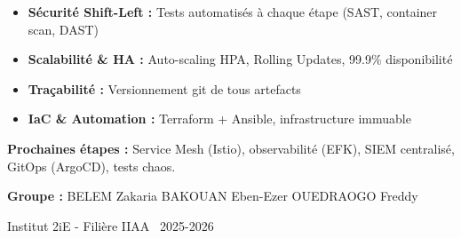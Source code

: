 \documentclass[12pt,a4paper]{article}
\begin{document}
\begin{importantbox}
\begin{itemize}
    \item \textbf{Sécurité Shift-Left :} Tests automatisés à chaque étape (SAST, container scan, DAST)
    \item \textbf{Scalabilité \& HA :} Auto-scaling HPA, Rolling Updates, 99.9\% disponibilité
    \item \textbf{Traçabilité :} Versionnement git de tous artefacts
    \item \textbf{IaC \& Automation :} Terraform + Ansible, infrastructure immuable
\end{itemize}
\end{importantbox}

\textbf{Prochaines étapes :} Service Mesh (Istio), observabilité (EFK), SIEM centralisé, GitOps (ArgoCD), tests chaos.

\vspace{1cm}

\begin{center}
    \textbf{Groupe :} BELEM Zakaria \quad BAKOUAN Eben-Ezer \quad OUEDRAOGO Freddy
    
    \vspace{0.3cm}
    
    {\small Institut 2iE - Filière IIAA \textbar\, 2025-2026}
\end{center}
\end{document}
